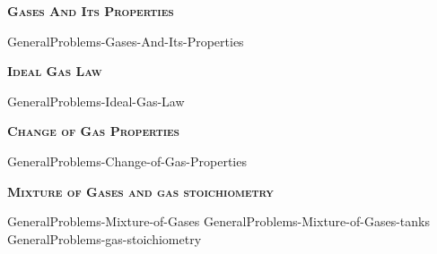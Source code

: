 \documentclass[main.tex]{subfiles}
\newcommand\chapterlabel{Ch-Gas}
\begin{document}
\newpage
\setdoublesep{0.35700 em}  %
\setatomsep{1.78500 em}    %
\setbondoffset{0.18265 em} %
\newcommand{\bondwidth}{0.06642 em} %
\setbondstyle{line width = \bondwidth}
\fancyhfoffset[E,O]{0pt}
\setlength{\columnsep}{30pt}
\begin{conclusion}
\end{conclusion}
\begin{multicols*}{2}\setcounter{numA}{1}

{\raggedright\textsc{\textbf{Gases And Its Properties }}\par}
{GeneralProblems-Gases-And-Its-Properties}

\iftoggle{chem121}{}{
{GeneralProblems-Measuring-pressure}
}

{\raggedright\textsc{\textbf{Ideal Gas Law }}\par}
{GeneralProblems-Ideal-Gas-Law }
{\raggedright\textsc{\textbf{Change of Gas Properties }}\par}
{GeneralProblems-Change-of-Gas-Properties}
{\raggedright\textsc{\textbf{Mixture of Gases and gas stoichiometry }}\par}
{GeneralProblems-Mixture-of-Gases}
{GeneralProblems-Mixture-of-Gases-tanks}
{GeneralProblems-gas-stoichiometry}
 
\iftoggle{chem121}{}{
{\raggedright\textsc{\textbf{Real gases and the kinetic molecular theory of gases }}\par}
{GeneralProblems-Real-gases-and-the-kinetic-molecular-theory-of-gases}
\clearpage\thispagestyle{empty}\mbox{}\clearpage

}
\end{multicols*} \iftoggle{showfinalanswers}{
\newpage\fancyhfoffset[E,O]{0pt}
\begin{answerbox}
\begin{answersenvironment}
 \begin{localsize}{10}
{ \checkoddpage\ifoddpage    \else   \clearpage\thispagestyle{empty}\mbox{}\clearpage\fi
\Large \bf Answers}
\SetupExSheets{ headings = inline-nr , counter-format = qu) ,}
\printsolutions 
  \vspace{20cm}
 \end{localsize}
 \end{answersenvironment}
\end{answerbox}
}{}
\checkoddpage\ifoddpage   \clearpage\thispagestyle{empty}\mbox{}\clearpage \else   \fi
\end{document}
